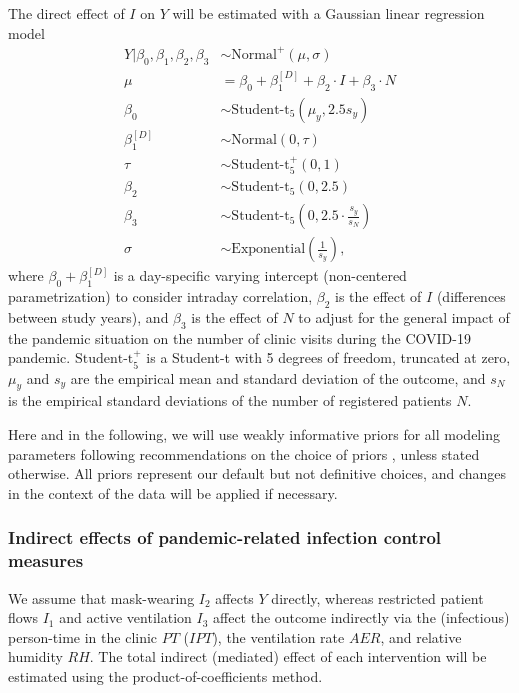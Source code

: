 \documentclass{article}
\begin{document}
The direct effect of $I$ on $Y$ will be estimated with a Gaussian linear regression model
\begin{align*}
    Y | \beta_0, \beta_1, \beta_2, \beta_3 &\sim \text{Normal}^{+}(\mu, \sigma) \\
    \mu &= \beta_0 + \beta_1^{[D]} + \beta_2 \cdot I + \beta_3 \cdot N \\
    \beta_0 &\sim \text{Student-t}_5\left(\mu_y, 2.5s_{y}\right) \\
    \beta_1^{[D]} &\sim \text{Normal}(0, \tau) \\
    \tau &\sim \text{Student-t}_5^{+}(0, 1) \\
    \beta_2 &\sim \text{Student-t}_5\left(0, 2.5\right) \\
    \beta_3 &\sim \text{Student-t}_5\left(0, 2.5\cdot \frac{s_{y}}{s_{N}}\right) \\
    \sigma &\sim \text{Exponential}\left(\frac{1}{s_{y}}\right),
\end{align*}
where $\beta_0 + \beta_1^{[D]}$ is a day-specific varying intercept (non-centered parametrization) to consider intraday correlation, $\beta_2$ is the effect of $I$ (differences between study years), and $\beta_3$ is the effect of $N$ to adjust for the general impact of the pandemic situation on the number of clinic visits during the COVID-19 pandemic. $\text{Student-t}_{5}^{+}$ is a Student-t with 5 degrees of freedom, truncated at zero, $\mu_{y}$ and $s_{y}$ are the empirical mean and standard deviation of the outcome, and $s_N$ is the empirical standard deviations of the number of registered patients $N$. 

Here and in the following, we will use weakly informative priors for all modeling parameters following recommendations on the choice of priors \cite{Gelman2008AAS,Gelman2008StatMed,Gelman2020RegOther,Stan2022,Gabry2023Priors}, unless stated otherwise. All priors represent our default but not definitive choices, and changes in the context of the data will be applied if necessary.

\subsubsection*{Indirect effects of pandemic-related infection control measures}

We assume that mask-wearing $I_2$ affects $Y$ directly, whereas restricted patient flows $I_1$ and active ventilation $I_3$ affect the outcome indirectly via the (infectious) person-time in the clinic $PT$ ($IPT$), the ventilation rate $AER$, and relative humidity $RH$. The total indirect (mediated) effect of each intervention will be estimated using the product-of-coefficients method.
\end{document}

